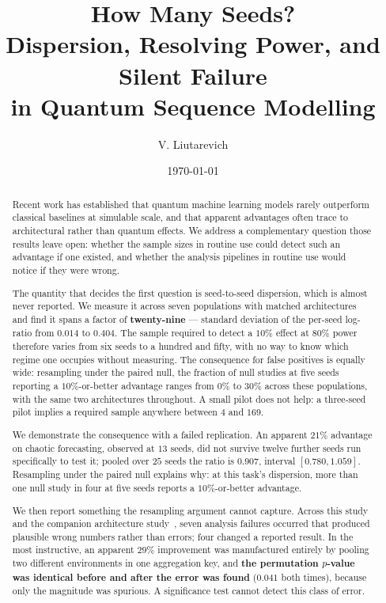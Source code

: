 \documentclass[11pt,onecolumn]{article}
\title{\bfseries How Many Seeds?\\
       Dispersion, Resolving Power, and Silent Failure\\
       in Quantum Sequence Modelling}
\author{V. Liutarevich
        \affiliation{\pend{affiliation}}
        \email{\pend{contact email}}}
\date{\today}
\newcommand{\maketitlefallback}{\maketitle}
\begin{document}
\maketitlefallback

\begin{abstract}
\noindent
Recent work has established that quantum machine learning models rarely
outperform classical baselines at simulable scale, and that apparent
advantages often trace to architectural rather than quantum effects. We
address a complementary question those results leave open: whether the
sample sizes in routine use could detect such an advantage if one
existed, and whether the analysis pipelines in routine use would notice
if they were wrong.

The quantity that decides the first question is seed-to-seed dispersion,
which is almost never reported. We measure it across seven populations
with matched architectures and find it spans a factor of
\textbf{twenty-nine} --- standard deviation of the per-seed log-ratio
from $0.014$ to $0.404$. The sample required to detect a $10\%$ effect
at $80\%$ power therefore varies from six seeds to a hundred and fifty,
with no way to know which regime one occupies without measuring. The
consequence for false positives is equally wide: resampling under the
paired null, the fraction of null studies at five seeds reporting a
$10\%$-or-better advantage ranges from $0\%$ to $30\%$ across these
populations, with the same two architectures throughout. A small pilot
does not help: a three-seed pilot implies a required sample anywhere
between $4$ and $169$.

We demonstrate the consequence with a failed replication. An apparent
$21\%$ advantage on chaotic forecasting, observed at $13$ seeds, did not
survive twelve further seeds run specifically to test it; pooled over
$25$ seeds the ratio is $0.907$, interval $[0.780, 1.059]$. Resampling
under the paired null explains why: at this task's dispersion, more than
one null study in four at five seeds reports a $10\%$-or-better
advantage.

We then report something the resampling argument cannot capture. Across
this study and the companion architecture study~\cite{paperb}, seven
analysis failures occurred that produced plausible wrong numbers rather
than errors; four changed a reported result. In the most instructive, an
apparent $29\%$ improvement was manufactured entirely by pooling two
different environments in one aggregation key, and \textbf{the
permutation $p$-value was identical before and after the error was
found} ($0.041$ both times), because only the magnitude was spurious. A
significance test cannot detect this class of error.


\end{abstract}
\end{document}
